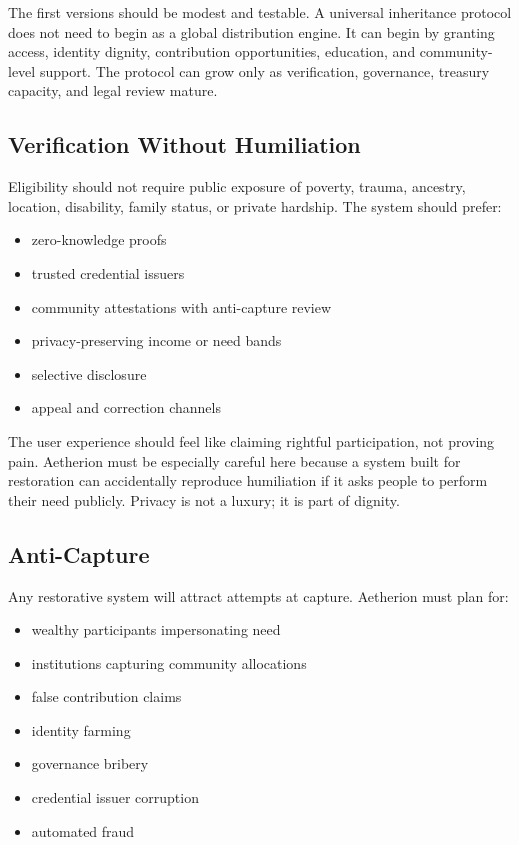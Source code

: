 \documentclass[12pt]{article}
\begin{document}
The first versions should be modest and testable. A universal inheritance protocol does not need to begin as a global distribution engine. It can begin by granting access, identity dignity, contribution opportunities, education, and community-level support. The protocol can grow only as verification, governance, treasury capacity, and legal review mature.

\subsection{Verification Without Humiliation}

Eligibility should not require public exposure of poverty, trauma, ancestry, location, disability, family status, or private hardship. The system should prefer:

\begin{itemize}
  \item zero-knowledge proofs
  \item trusted credential issuers
  \item community attestations with anti-capture review
  \item privacy-preserving income or need bands
  \item selective disclosure
  \item appeal and correction channels
\end{itemize}

The user experience should feel like claiming rightful participation, not proving pain. Aetherion must be especially careful here because a system built for restoration can accidentally reproduce humiliation if it asks people to perform their need publicly. Privacy is not a luxury; it is part of dignity.

\subsection{Anti-Capture}

Any restorative system will attract attempts at capture. Aetherion must plan for:

\begin{itemize}
  \item wealthy participants impersonating need
  \item institutions capturing community allocations
  \item false contribution claims
  \item identity farming
  \item governance bribery
  \item credential issuer corruption
  \item automated fraud
\end{itemize}
\end{document}
